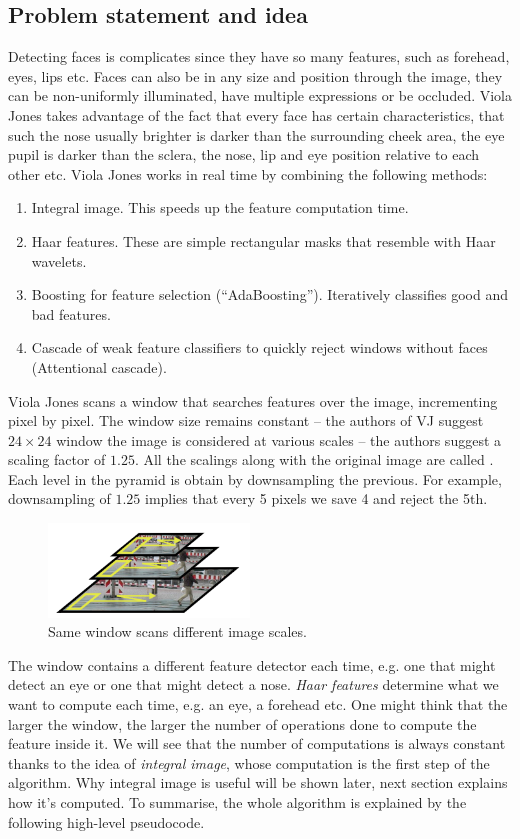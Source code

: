 \documentclass[a4paper]{article}
\begin{document}
\subsection{Problem statement and idea}
Detecting faces is complicates since they have so many features, such as forehead, eyes, lips etc. Faces can also be in any size and position through the image, they can be non-uniformly illuminated, have multiple expressions or be occluded. Viola Jones takes advantage of the fact that every face has certain characteristics, that such the nose usually brighter is darker than the surrounding cheek area, the eye pupil is darker than the sclera, the nose, lip and eye position relative to each other etc. Viola Jones works in real time by combining the following methods:
\begin{enumerate}
    \item Integral image. This speeds up the feature computation time.
    \item Haar features. These are simple rectangular masks that resemble with Haar wavelets.
    \item Boosting for feature selection (``AdaBoosting''). Iteratively classifies good and bad features.
    \item Cascade of weak feature classifiers to quickly reject windows without faces (Attentional cascade).
\end{enumerate}
Viola Jones scans a window that searches features over the image, incrementing pixel by pixel. The window size remains constant -- the authors of VJ suggest $24\times 24$ window the image is considered at various scales -- the authors suggest a scaling factor of $1.25$.  All the scalings along with the original image are called . Each level in the pyramid is obtain by downsampling the previous. For example, downsampling of $1.25$ implies that every 5 pixels we save 4 and reject the 5th.
\begin{figure}[H]
    \centering
    \includegraphics[height=2.5cm]{img/window_slide_loc_scale.PNG}
    \caption{Same window scans different image scales.}
\end{figure}
The window contains a different feature detector each time, e.g. one that might detect an eye or one that might detect a nose. \textit{Haar features} determine what we want to compute each time, e.g. an eye, a forehead etc. One might think that the larger the window, the larger the number of operations done to compute the feature inside it. We will see that the number of computations is always constant thanks to the idea of \textit{integral image}, whose computation is the first step of the algorithm. Why integral image is useful will be shown later, next section explains  how it's computed. To summarise, the whole algorithm is explained by the following high-level pseudocode.
\end{document}
